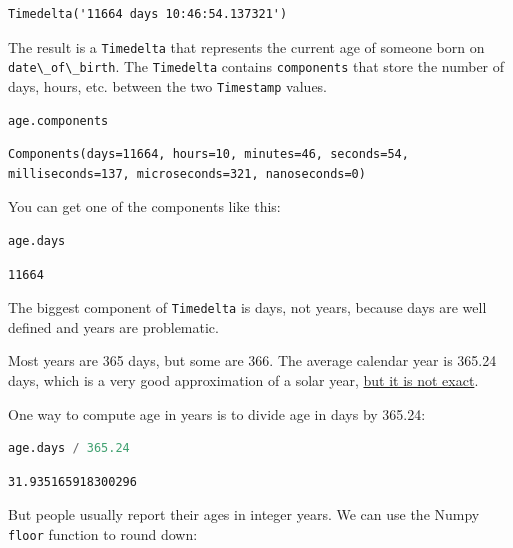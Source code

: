 \begin{lstlisting}[style=output]
Timedelta('11664 days 10:46:54.137321')
\end{lstlisting}

The result is a \passthrough{\lstinline!Timedelta!} that represents the
current age of someone born on
\passthrough{\lstinline!date\_of\_birth!}. The
\passthrough{\lstinline!Timedelta!} contains
\passthrough{\lstinline!components!} that store the number of days,
hours, etc. between the two \passthrough{\lstinline!Timestamp!} values.

\begin{lstlisting}[language=Python,style=source]
age.components
\end{lstlisting}

\begin{lstlisting}[style=output]
Components(days=11664, hours=10, minutes=46, seconds=54, milliseconds=137, microseconds=321, nanoseconds=0)
\end{lstlisting}

You can get one of the components like this:

\begin{lstlisting}[language=Python,style=source]
age.days
\end{lstlisting}

\begin{lstlisting}[style=output]
11664
\end{lstlisting}

The biggest component of \passthrough{\lstinline!Timedelta!} is days,
not years, because days are well defined and years are problematic.

Most years are 365 days, but some are 366. The average calendar year is
365.24 days, which is a very good approximation of a solar year,
\href{https://pumas.jpl.nasa.gov/files/04_21_97_1.pdf}{but it is not
exact}.

One way to compute age in years is to divide age in days by 365.24:

\begin{lstlisting}[language=Python,style=source]
age.days / 365.24
\end{lstlisting}

\begin{lstlisting}[style=output]
31.935165918300296
\end{lstlisting}

But people usually report their ages in integer years. We can use the
Numpy \passthrough{\lstinline!floor!} function to round down:

